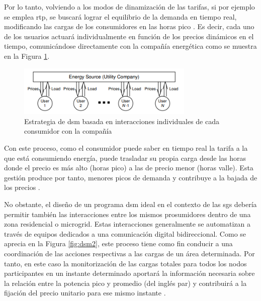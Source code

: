 \vspace{3mm}

Por lo tanto, volviendo a los modos de dinamización de las tarifas, si por ejemplo se emplea \gls{rtp}, se buscará lograr el equilibrio de la demanda en tiempo real, modificando las cargas de los consumidores en las horas pico \cite{rtp}. Es decir, cada uno de los usuarios actuará individualmente en función de los precios dinámicos en el tiempo, comunicándose directamente con la compañía energética como se muestra en la Figura \ref{fig:dsm1}. 

\vspace{3mm}

\begin{figure}[h!]
  \centering
  \includegraphics[width=0.75\textwidth]{img/teoria/dsm1.png}
  \caption{Estrategia de \acrshort{dsm} basada en interacciones individuales de cada consumidor con la compañía~\cite{pricing}}
  \label{fig:dsm1}
\end{figure}

\vspace{3mm}

Con este proceso, como el consumidor puede saber en tiempo real la tarifa a la que está consumiendo energía, puede trasladar su propia carga desde las horas donde el precio es más alto (horas pico) a las de precio menor (horas valle). Esta gestión produce por tanto, menores picos de demanda y contribuye a la bajada de los precios \cite{dsm} \cite{pricing}.

\vspace{3mm}

No obstante, el diseño de un programa \gls{dsm} ideal en el contexto de las \gls{sg}s debería permitir también las interacciones entre los mismos prosumidores dentro de una zona residencial o microgrid. Estas interacciones generalmente se automatizan a través de equipos dedicados a una comunicación digital bidireccional. Como se aprecia en la Figura \ref{fig:dsm2}, este proceso tiene como fin conducir a una coordinación de las acciones respectivas a las cargas de un área determinada. Por tanto, en este caso la monitorización de las cargas totales para todos los nodos participantes en un instante determinado aportará la información necesaria sobre la relación entre la potencia pico y promedio (del inglés \gls{par}) y contribuirá a la fijación del precio unitario para ese mismo instante \cite{pricing}.

